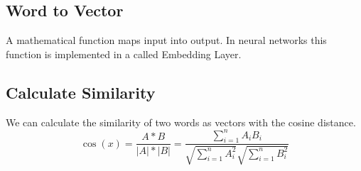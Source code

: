 \subsection{Word to Vector}
A mathematical function maps input into output. In neural networks this function is implemented in a called Embedding Layer. 

\subsection{Calculate Similarity}
We can calculate the similarity of two words as vectors with the cosine distance.
\[\cos(x)=\frac{A * B}{|A|*|B|} = \frac{\sum_{i=1}^n A_{i} B_{i}}{\sqrt{\sum_{i=1}^n A_{i}^2} \sqrt{\sum_{i=1}^n B_{i}^2}} \]



